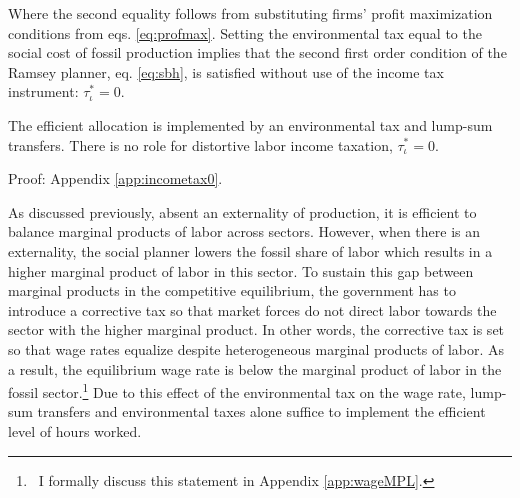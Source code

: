 Where the second equality follows from substituting firms' profit maximization conditions from eqs. \eqref{eq:profmax}.
Setting the environmental tax equal to the social cost of fossil production implies that the second first order condition of the Ramsey planner, eq. \eqref{eq:sbh}, is satisfied without use of the income tax instrument: $\tau_{\iota}^*=0$. 
\begin{prop}\label{prop:1}
	The efficient allocation is implemented by an environmental tax and lump-sum transfers. There is no role for distortive labor income taxation, $\tau_{\iota}^*=0$.
\end{prop}
Proof: Appendix \ref{app:incometax0}. 

As discussed previously, absent an externality of production, it is efficient to balance marginal products of labor across sectors. However, when there is an externality, the social planner lowers the fossil share of labor which results in a higher marginal product of labor in this sector. To sustain this gap between marginal products in the competitive equilibrium, the government has to introduce a corrective tax so that market forces do not direct labor towards the sector with the higher marginal product. In other words, the corrective tax is set so that wage rates equalize despite heterogeneous marginal products of labor. As a result, the equilibrium wage rate is below the marginal product of labor in the fossil sector.\footnote{\ I formally discuss this statement in Appendix \ref{app:wageMPL}.} 
Due to this effect of the environmental tax on the wage rate, lump-sum transfers and environmental taxes alone suffice to implement the efficient level of hours worked. 

